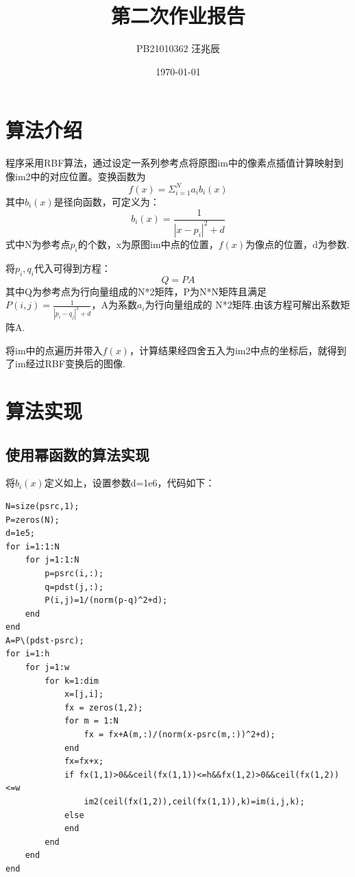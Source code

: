 \documentclass[12pt]{article}
\title{第二次作业报告}
\author{PB21010362 汪兆辰}
\date{\today}
\begin{document}
\maketitle

\section{算法介绍}
程序采用RBF算法，通过设定一系列参考点将原图im中的像素点插值计算映射到像im2中的对应位置。变换函数为
\begin{equation}
    f(x)= \Sigma_{i=1}^N a_i b_i(x)
\end{equation}
其中$b_i (x)$是径向函数，可定义为：
\begin{equation}
    b_i (x)=\frac{1}{|x-p_i|^2+d}
\end{equation}
式中N为参考点$p_i$的个数，x为原图im中点的位置，$f(x)$为像点的位置，d为参数.

将$p_i,q_i$代入可得到方程：
\begin{equation}
    Q=PA
\end{equation}
其中Q为参考点为行向量组成的N*2矩阵，P为N*N矩阵且满足$P(i,j)=\frac{1}{|p_i -q_j|^2 +d}$，A为系数$a_i$为行向量组成的
N*2矩阵.由该方程可解出系数矩阵A.

将im中的点遍历并带入$f(x)$，计算结果经四舍五入为im2中点的坐标后，就得到了im经过RBF变换后的图像.

\section{算法实现}

\subsection{使用幂函数的算法实现}

将$b_i(x)$定义如上，设置参数d=1e6，代码如下：
\begin{lstlisting}
N=size(psrc,1);
P=zeros(N);
d=1e5;
for i=1:1:N
    for j=1:1:N
        p=psrc(i,:);
        q=pdst(j,:);
        P(i,j)=1/(norm(p-q)^2+d);
    end
end
A=P\(pdst-psrc);
for i=1:h
    for j=1:w
        for k=1:dim
            x=[j,i];
            fx = zeros(1,2);
            for m = 1:N
                fx = fx+A(m,:)/(norm(x-psrc(m,:))^2+d);
            end
            fx=fx+x;
            if fx(1,1)>0&&ceil(fx(1,1))<=h&&fx(1,2)>0&&ceil(fx(1,2))<=w
                im2(ceil(fx(1,2)),ceil(fx(1,1)),k)=im(i,j,k);
            else
            end
        end
    end
end
\end{lstlisting}
\end{document}
